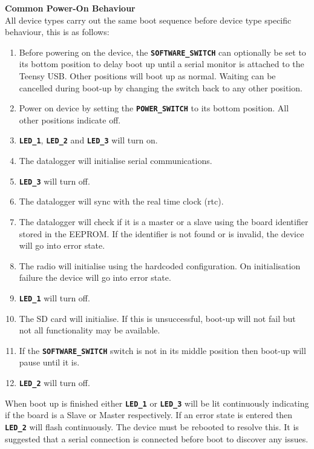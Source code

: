 \newpage\textbf{Common Power-On Behaviour}\\
All device types carry out the same boot sequence before device type specific behaviour, this is as follows:
\begin{enumerate}[label=\textbf{\arabic*}]
	\item  Before powering on the device, the \textbf{\texttt{SOFTWARE\_SWITCH}} can optionally be set to its bottom position to delay boot up until a serial monitor is attached to the Teensy USB. Other positions will boot up as normal. Waiting can be cancelled during boot-up by changing the switch back to any other position.
	\item Power on device by setting the \textbf{\texttt{POWER\_SWITCH}} to its bottom position. All other positions indicate off.
	\item \textbf{\texttt{LED\_1}}, \textbf{\texttt{LED\_2}} and \textbf{\texttt{LED\_3}} will turn on.
	\item The datalogger will initialise serial communications.
	\item \textbf{\texttt{LED\_3}} will turn off.
	\item The datalogger will sync with the real time clock (\ac{rtc}).
	\item The datalogger will check if it is a master or a slave using the board identifier stored in the EEPROM. If the identifier is not found or is invalid, the device will go into error state.
	\item The radio will initialise using the hardcoded configuration. On initialisation failure the device will go into error state.
	\item \textbf{\texttt{LED\_1}} will turn off.
	\item The SD card will initialise. If this is unsuccessful, boot-up will not fail but not all functionality may be available.
	\item If the \textbf{\texttt{SOFTWARE\_SWITCH}} switch is not in its middle position then boot-up will pause until it is.
	\item \textbf{\texttt{LED\_2}} will turn off.	
\end{enumerate}

When boot up is finished either \textbf{\texttt{LED\_1}} or \textbf{\texttt{LED\_3}} will be lit continuously indicating if the board is a Slave or Master respectively. If an error state is entered then \textbf{\texttt{LED\_2}} will flash continuously. The device must be rebooted to resolve this. It is suggested that a serial connection is connected before boot to discover any issues.

